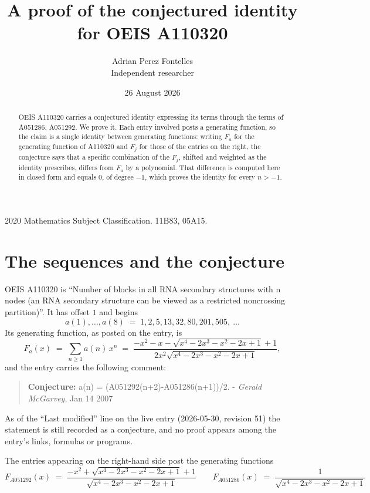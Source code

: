 \documentclass[11pt,a4paper]{article}
\title{A proof of the conjectured identity for OEIS A110320}
\author{Adrian Perez Fontelles\\ \small Independent researcher}
\date{26 August 2026}
\theoremstyle{plain}
\theoremstyle{definition}
\begin{document}
\maketitle

\begin{abstract}
OEIS A110320 carries a conjectured identity expressing its terms through the terms of
A051286, A051292. We prove it. Each entry involved posts a generating function, so the claim is
a single identity between generating functions: writing $F_{a}$ for the generating
function of A110320 and $F_{j}$ for those of the entries on the right, the conjecture
says that a specific combination of the $F_{j}$, shifted and weighted as the identity
prescribes, differs from $F_{a}$ by a polynomial. That difference is computed here in
closed form and equals $0$, of degree $-1$, which proves the identity for
every $n>-1$.
\end{abstract}

\noindent\small 2020 Mathematics Subject Classification. 11B83, 05A15.\normalsize

\section{The sequences and the conjecture}

OEIS A110320 is ``Number of blocks in all RNA secondary structures with n nodes (an RNA secondary structure can be viewed as a restricted noncrossing partition)''. It has offset $1$ and begins
\[
a(1),\dots,a(8)\;=\;1, 2, 5, 13, 32, 80, 201, 505,\ \dots
\]
Its generating function, as posted on the entry, is
\begin{equation}\label{eq:gf}
F_{a}(x)\;=\;\sum_{n\ge 1} a(n)\,x^{n}\;=\;\frac{- x^{2} - x - \sqrt{x^{4} - 2 x^{3} - x^{2} - 2 x + 1} + 1}{2 x^{2} \sqrt{x^{4} - 2 x^{3} - x^{2} - 2 x + 1}} ,
\end{equation}
and the entry carries the following comment:
\begin{quote}\small
\textbf{Conjecture:} a(n) = (A051292(n+2)-A051286(n+1))/2. - \emph{Gerald McGarvey}, Jan 14 2007
\end{quote}
As of the ``Last modified'' line on the live entry (2026-05-30, revision 51) the
statement is still recorded as a conjecture, and no proof appears among the entry's links,
formulas or programs.

The entries appearing on the right-hand side post the generating functions
\[
F_{A051292}(x) \;=\; \frac{- x^{2} + \sqrt{x^{4} - 2 x^{3} - x^{2} - 2 x + 1} + 1}{\sqrt{x^{4} - 2 x^{3} - x^{2} - 2 x + 1}} \qquad F_{A051286}(x) \;=\; \frac{1}{\sqrt{x^{4} - 2 x^{3} - x^{2} - 2 x + 1}}
\]
\end{document}
